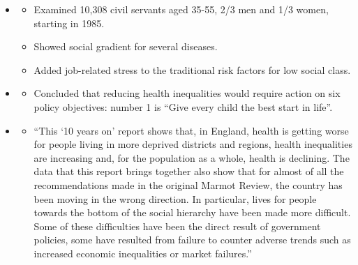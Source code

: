 \begin{itemize}
                \item {}
                \begin{itemize}
                    \item Examined 10,308 civil servants aged 35-55, 2/3 men and 1/3 women, starting in 1985.
                    \item Showed social gradient for several diseases.
                    \item Added job-related stress to the traditional risk factors for low social class.
                \end{itemize}
        
                \item {}
                \begin{itemize}
                    \item Concluded that reducing health inequalities would require action on six policy objectives: number 1 is “Give every child the best start in life”.
                \end{itemize}
        
                \item {}
                \begin{itemize}
                    \item “This ‘10 years on’ report shows that, in England, health is getting worse for people living in more deprived districts and regions, health inequalities are increasing  and, for the population as a whole, health is declining. The data that this report brings together also show that for almost of all the recommendations made in the original Marmot Review, the country has been moving in the wrong direction. In particular, lives for people towards the bottom of the social hierarchy have been made more difficult. Some of these difficulties have been the direct result of government policies, some have resulted from failure to counter adverse trends such as increased economic inequalities or market failures.”
                \end{itemize}
            \end{itemize} 

